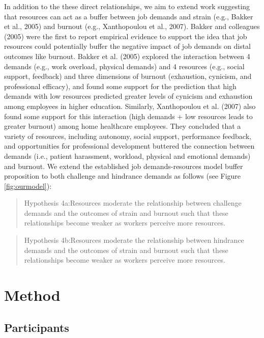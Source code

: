 \documentclass[
  man]{apa7}
\begin{document}
In addition to the these direct relationships, we aim to extend work suggesting that resources can act as a buffer between job demands and strain (e.g., Bakker et al., 2005) and burnout (e.g., Xanthopoulou et al., 2007). Bakker and colleagues (2005) were the first to report empirical evidence to support the idea that job resources could potentially buffer the negative impact of job demands on distal outcomes like burnout. Bakker et al. (2005) explored the interaction between 4 demands (e.g., work overload, physical demands) and 4 resources (e.g., social support, feedback) and three dimensions of burnout (exhaustion, cynicism, and professional efficacy), and found some support for the prediction that high demands with low resources predicted greater levels of cynicism and exhaustion among employees in higher education. Similarly, Xanthopoulou et al. (2007) also found some support for this interaction (high demands + low resources leads to greater burnout) among home healthcare employees. They concluded that a variety of resources, including autonomy, social support, performance feedback, and opportunities for professional development buttered the connection between demands (i.e., patient harassment, workload, physical and emotional demands) and burnout. We extend the established job demands-resources model buffer proposition to both challenge and hindrance demands as follows (see Figure \ref{fig:ourmodel}):

\begin{quote}
Hypothesis 4a:Resources moderate the relationship between challenge demands and the outcomes of strain and burnout such that these relationships become weaker as workers perceive more resources.
\end{quote}

\begin{quote}
Hypothesis 4b:Resources moderate the relationship between hindrance demands and the outcomes of strain and burnout such that these relationships become weaker as workers perceive more resources.
\end{quote}

\hypertarget{method}{%
\section{Method}\label{method}}

\hypertarget{participants}{%
\subsection{Participants}\label{participants}}
\end{document}
